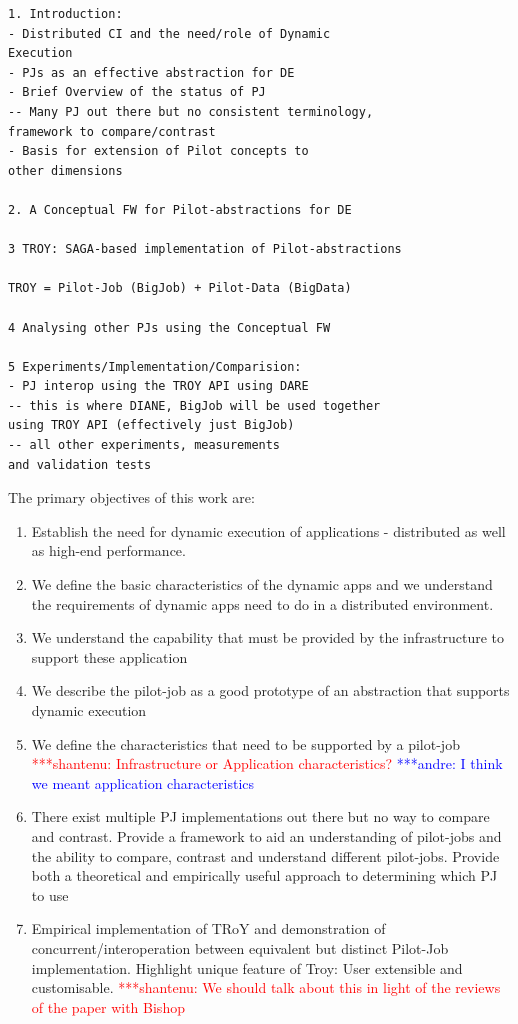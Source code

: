 \documentclass[conference,final]{IEEEtran}
\newcommand{\jhanote}[1]{ {\textcolor{red} { ***shantenu: #1 }}}
\newcommand{\alnote}[1]{ {\textcolor{blue} { ***andre: #1 }}}
\newcommand{\alnote}[1]{}
\newcommand{\jhanote}[1]{}
\begin{document}
\begin{footnotesize}
\begin{verbatim}
1. Introduction:
- Distributed CI and the need/role of Dynamic 
Execution 
- PJs as an effective abstraction for DE
- Brief Overview of the status of PJ
-- Many PJ out there but no consistent terminology, 
framework to compare/contrast
- Basis for extension of Pilot concepts to 
other dimensions
 
2. A Conceptual FW for Pilot-abstractions for DE

3 TROY: SAGA-based implementation of Pilot-abstractions

TROY = Pilot-Job (BigJob) + Pilot-Data (BigData)

4 Analysing other PJs using the Conceptual FW

5 Experiments/Implementation/Comparision:
- PJ interop using the TROY API using DARE
-- this is where DIANE, BigJob will be used together
using TROY API (effectively just BigJob)
-- all other experiments, measurements 
and validation tests

\end{verbatim}
\end{footnotesize}

The primary objectives of this work are:

\begin{enumerate}

\item Establish the need for dynamic execution of applications -
  distributed as well as high-end performance.

\item We define the basic characteristics of the dynamic apps and we
  understand the requirements of dynamic apps need to do in a
  distributed environment.

\item We understand the capability that must be provided by the
  infrastructure to support these application

\item We describe the pilot-job as a good prototype of an abstraction
  that supports dynamic execution

\item We define the characteristics that need to be supported by a
  pilot-job \jhanote{Infrastructure or Application characteristics?}
  \alnote{I think we meant application characteristics}

\item There exist multiple PJ implementations out there but no way to
  compare and contrast. Provide a framework to aid an understanding of
  pilot-jobs and the ability to compare, contrast and understand
  different pilot-jobs.  Provide both a theoretical and empirically
  useful approach to determining which PJ to use

\item Empirical implementation of TRoY and demonstration of
  concurrent/interoperation between equivalent but distinct Pilot-Job
  implementation. Highlight unique feature of Troy: User extensible
  and customisable. \jhanote{We should talk about this in light of the
    reviews of the paper with Bishop}
\end{enumerate}
\end{document}
